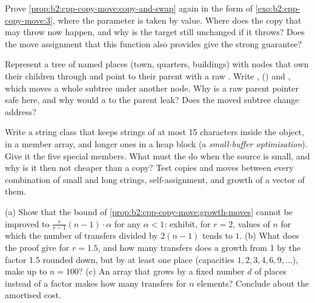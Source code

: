 \begin{exercise}[$\star\star$]\label{exo:b2:cpp-copy-move:8}
Prove \cref{prop:b2:cpp-copy-move:copy-and-swap} again in the form of \cref{exo:b2:cpp-copy-move:3}, where the
parameter is taken by value. Where does the copy that may throw now happen, and why is the target still unchanged
if it throws? Does the move assignment that this function also provides give the strong guarantee?
\end{exercise}

\begin{exercise}[$\star\star$]\label{exo:b2:cpp-copy-move:9}
Represent a tree of named places (town, quarters, buildings) with nodes that own their children through
 and point to their parent with a raw . Write ,
 () and , which moves a whole subtree under another node.
Why is a raw parent pointer safe here, and why would a  to the parent leak? Does the moved
subtree change address?
\end{exercise}

\begin{exercise}[$\star\star\star$]\label{exo:b2:cpp-copy-move:10}
Write a string class  that keeps strings of at most 15 characters inside the object, in a member
array, and longer ones in a heap block (a \emph{small-buffer optimisation}). Give it the five special members. What
must the  do when the source is small, and why is it then not cheaper than a copy? Test copies and
moves between every combination of small and long strings, self-assignment, and growth of a vector of them.
\end{exercise}

\begin{exercise}[$\star\star\star$]\label{exo:b2:cpp-copy-move:11}
(a) Show that the bound of \cref{prop:b2:cpp-copy-move:growth-moves} cannot be improved to $\frac{r}{r-1}(n-1)
\cdot \alpha$ for any $\alpha < 1$: exhibit, for $r = 2$, values of $n$ for which the number of transfers divided by
$2(n-1)$ tends to $1$. (b) What does the proof give for $r = 1.5$, and how many transfers does a growth from 1 by
the factor 1.5 rounded down, but by at least one place (capacities $1, 2, 3, 4, 6, 9, \dots$), make up to $n = 100$? (c) An array that grows by a
fixed number $d$ of places instead of a factor makes how many transfers for $n$ elements? Conclude about the
amortised cost.
\end{exercise}

